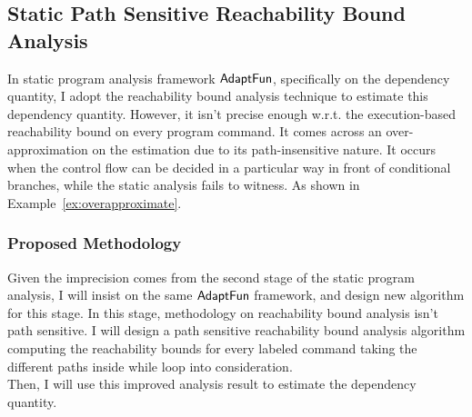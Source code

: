 \subsection{Static Path Sensitive Reachability Bound Analysis}
\label{subsec:furthers-reachability}
In static program analysis framework $\textsf{AdaptFun}$, specifically on the dependency quantity, 
I adopt the reachability bound analysis technique to estimate this dependency quantity.
However, it isn't precise enough w.r.t. the execution-based reachability bound on every program command.
It comes across an over-approximation on the estimation due to its path-insensitive nature. 
It occurs when the control flow can be decided in a particular way in front of conditional branches, 
while the static analysis fails to witness. 
As shown in Example~\ref{ex:overapproximate}.


\subsubsection{Proposed Methodology}
\label{subsubsec:furthers-reachability}
Given the imprecision comes from the second stage of the static program analysis,
I will insist on the same $\textsf{AdaptFun}$ framework,
and design new algorithm for this stage.
In this stage, 
methodology on reachability bound analysis isn't path sensitive. 
I will design a path sensitive reachability bound analysis algorithm computing the 
reachability bounds for every labeled command taking the different paths inside while loop into consideration.
\\
Then, I will use this improved analysis result to estimate the dependency quantity.
%


